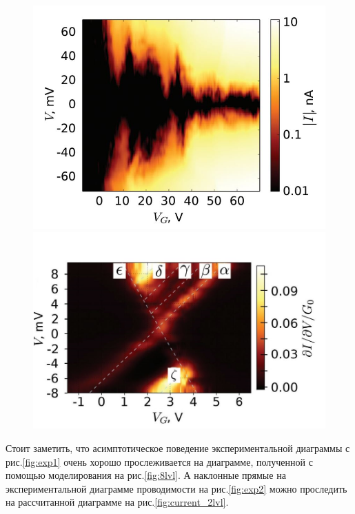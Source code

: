 \documentclass[12pt,a4paper]{report}
\begin{document}
\begin{figure}[h!]
\begin{floatrow}
           {\includegraphics[scale = 0.35]{SASET exp our}}
           {\includegraphics[scale = 0.35]{SASET exp our der}}  
\end{floatrow}    
\end{figure}
Стоит заметить, что асимптотическое поведение экспериментальной диаграммы с рис.\ref{fig:exp1} очень хорошо прослеживается на диаграмме, полученной с помощью моделирования на рис.\ref{fig:8lvl}. А наклонные прямые на экспериментальной диаграмме проводимости на рис.\ref{fig:exp2} можно проследить на рассчитанной  диаграмме на рис.\ref{fig:current_2lvl}.
\end{document}
